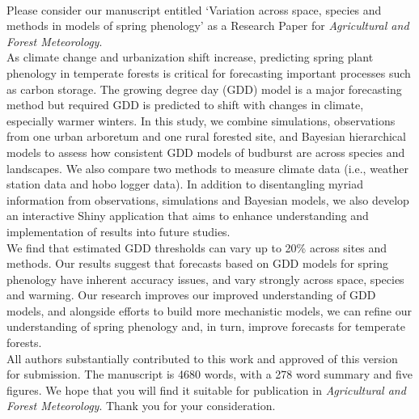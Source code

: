\documentclass[11pt,a4paper]{article}
\begin{document}


\vspace{1.5ex}


\vspace{3ex}\\
\noindent Please consider our manuscript entitled `Variation across space, species and methods in models of spring phenology' as a Research Paper for \textit{Agricultural and Forest Meteorology}. \\

As climate change and urbanization shift increase, predicting spring plant phenology in temperate forests is critical for forecasting important processes such as carbon storage. The growing degree day (GDD) model is a major forecasting method but required GDD is predicted to shift with changes in climate, especially warmer winters. In this study, we combine simulations, observations from one urban arboretum and one rural forested site, and Bayesian hierarchical models to assess how consistent GDD models of budburst are across species and landscapes. We also compare two methods to measure climate data (i.e., weather station data and hobo logger data). In addition to disentangling myriad information from observations, simulations and Bayesian models, we also develop an interactive Shiny application that aims to enhance understanding and implementation of results into future studies. \\

We find that estimated GDD thresholds can vary up to 20\% across sites and methods. Our results suggest that forecasts based on GDD models for spring phenology have inherent accuracy issues, and vary strongly across space, species and warming. Our research improves our improved understanding of GDD models, and alongside efforts to build more mechanistic models, we can refine our understanding of spring phenology and, in turn, improve forecasts for temperate forests. \\

All authors substantially contributed to this work and approved of this version for submission. The manuscript is 4680 words, with a 278 word summary and five figures. We hope that you will find it suitable for publication in \textit{Agricultural and Forest Meteorology}. Thank you for your consideration. \\
\end{document}
